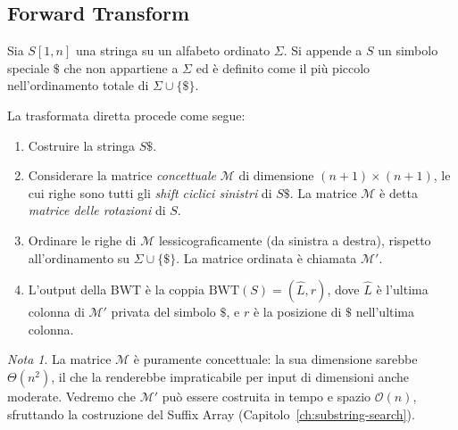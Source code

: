 \documentclass[12pt, a4paper, oneside]{book}
\theoremstyle{plain}
\theoremstyle{definition}
\theoremstyle{remark}
\newtheorem{nota}[teorema]{Nota}
\newcommand{\OO}[1]{\mathcal{O}\!\left(#1\right)}
\newcommand{\Th}[1]{\Theta\!\left(#1\right)}
\newcommand{\bwt}{\mathrm{BWT}}
\begin{document}
\subsection{Forward Transform}
\label{subsec:bwt-forward}

Sia $S[1,n]$ una stringa su un alfabeto ordinato $\Sigma$. Si appende a $S$ un simbolo speciale $\$$ che non appartiene a $\Sigma$ ed è definito come il più piccolo nell'ordinamento totale di $\Sigma \cup \{\$\}$.

La trasformata diretta procede come segue:

\begin{enumerate}
  \item Costruire la stringa $S\$$.
  \item Considerare la matrice \emph{concettuale} $\mathcal{M}$ di dimensione $(n+1) \times (n+1)$, le cui righe sono tutti gli \emph{shift ciclici sinistri} di $S\$$. La matrice $\mathcal{M}$ è detta \emph{matrice delle rotazioni} di $S$.
  \item Ordinare le righe di $\mathcal{M}$ lessicograficamente (da sinistra a destra), rispetto all'ordinamento su $\Sigma \cup \{\$\}$. La matrice ordinata è chiamata $\mathcal{M}'$.
  \item L'output della BWT è la coppia $\bwt(S) = (\widehat{L}, r)$, dove $\widehat{L}$ è l'ultima colonna di $\mathcal{M}'$ privata del simbolo $\$$, e $r$ è la posizione di $\$$ nell'ultima colonna.
\end{enumerate}

\begin{nota}
La matrice $\mathcal{M}$ è puramente concettuale: la sua dimensione sarebbe $\Th{n^2}$, il che la renderebbe impraticabile per input di dimensioni anche moderate. Vedremo che $\mathcal{M}'$ può essere costruita in tempo e spazio $\OO{n}$, sfruttando la costruzione del Suffix Array (Capitolo~\ref{ch:substring-search}).
\end{nota}
\end{document}
